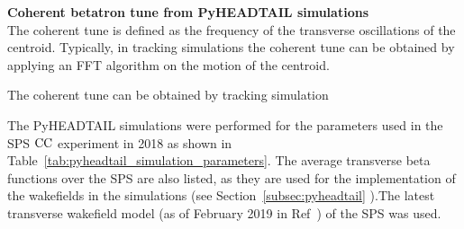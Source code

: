 \textbf{Coherent betatron tune from PyHEADTAIL simulations}\\
   \label{tab:pyheadtail_simulation_parameters}
The coherent tune is defined as the frequency of the transverse oscillations of the centroid.
Typically, in tracking simulations the coherent tune can be obtained by applying an FFT algorithm on the motion of the centroid.


The coherent tune can be obtained by tracking simulation 



The PyHEADTAIL simulations were performed for the parameters used in the SPS ${\mathrm{CC}}$ experiment in 2018 as shown in Table~\ref{tab:pyheadtail_simulation_parameters}. The average transverse beta functions over the SPS are also listed, as they are used for the implementation of the wakefields in the simulations (see Section~\ref{subsec:pyheadtail} ).The latest transverse wakefield model (as of February 2019 in Ref~\cite{sps_impedance_model_git}) of the SPS was used.


